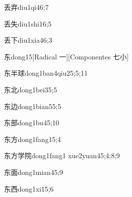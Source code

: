 \begin{verbete}{丢弃}{diu1qi4}{6;7}
\end{verbete}

\begin{verbete}{丢失}{diu1shi1}{6;5}
\end{verbete}

\begin{verbete}{丢下}{diu1xia4}{6;3}
\end{verbete}

\begin{verbete}{东}{dong1}{5}[Radical ⼀][Componentes 七小]
\end{verbete}

\begin{verbete}{东半球}{dong1ban4qiu2}{5;5;11}
\end{verbete}

\begin{verbete}{东北}{dong1bei3}{5;5}
\end{verbete}

\begin{verbete}{东边}{dong1bian5}{5;5}
\end{verbete}

\begin{verbete}{东部}{dong1bu4}{5;10}
\end{verbete}

\begin{verbete}{东方}{dong1fang1}{5;4}
\end{verbete}

\begin{verbete}{东方学院}{dong1fang1 xue2yuan4}{5;4;8;9}
\end{verbete}

\begin{verbete}{东面}{dong1mian4}{5;9}
\end{verbete}

\begin{verbete}{东西}{dong1xi1}{5;6}
\end{verbete}


